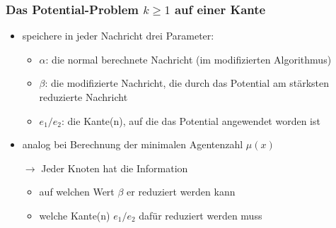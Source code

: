 \documentclass{beamer}
\begin{document}
	\begin{frame}
		\frametitle{Das Potential-Problem $k \geq 1$ auf einer Kante}
		\large
				
		\begin{itemize}
			\item speichere in jeder Nachricht drei Parameter:
			
			\begin{itemize}
				\item $\alpha$: die normal berechnete Nachricht (im modifizierten Algorithmus)
				\item $\beta$: die modifizierte Nachricht, die durch das Potential am stärksten reduzierte Nachricht
				\item $e_{1} / e_{2}$: die Kante(n), auf die das Potential angewendet worden ist
			\end{itemize}
				
			\item analog bei Berechnung der minimalen Agentenzahl $\mu(x)$
			
			\item[$\rightarrow$] Jeder Knoten hat die Information
			
				\begin{itemize}
					\item auf welchen Wert $\beta$ er reduziert werden kann
					
					\item welche Kante(n) $e_{1} / e_{2}$ dafür reduziert werden muss
				\end{itemize}
			
		\end{itemize}
				
	\end{frame}
	
%		
%		
	
\end{document}
